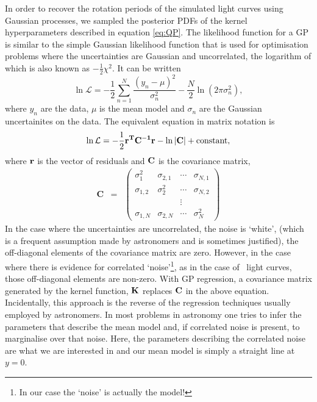 In order to recover the rotation periods of the simulated light curves using
Gaussian processes, we sampled the posterior PDFs of the kernel
hyperparameters described in equation \ref{eq:QP}.
The likelihood function for a GP is similar to the simple Gaussian likelihood
function that is used for optimisation problems where the uncertainties are
Gaussian and uncorrelated, the logarithm of which is also known as
$-\frac{1}{2}\chi^2$.
It can be written
\begin{equation}
\ln \mathcal{L} = -\frac{1}{2}\sum_{n=1}^N\frac{(y_n-\mu)^2}{\sigma_n^2}
    - \frac{N}{2}\ln(2\pi\sigma_n^2),
\end{equation}
\label{eq:chi2}
where $y_n$ are the data, $\mu$ is the mean model and $\sigma_n$ are the
Gaussian uncertainites on the data.
The equivalent equation in matrix notation is
\begin{equation}
\ln \mathcal{L} = -\frac{1}{2}\bf{r}^T\bf{C}^{-1}\bf{r}-\ln|\bf{C}|
    + \mathrm{constant},
\end{equation}
\label{eq:lhf1}
where $\bf{r}$ is the vector of residuals and $\bf{C}$ is the covariance
matrix,
\begin{eqnarray}
	\mathbf{C} &=& \left (\begin{array}{cccc}
	\sigma^2_1 & \sigma_{2, 1} & \cdots & \sigma_{N, 1} \\
	\sigma_{1, 2} & \sigma^2_2 & \cdots & \sigma_{N, 2} \\
    && \vdots & \\
	\sigma_{1, N} & \sigma_{2, N} & \cdots & \sigma^2_N
\end{array}\right )
\end{eqnarray}
In the case where the uncertainties are uncorrelated, the noise is `white',
(which is a frequent assumption made by astronomers and is sometimes
justified), the off-diagonal elements of the covariance matrix are zero.
However, in the case where there is evidence for correlated
`noise'\footnote{In our case the `noise' is actually the model!}, as in the
case of \Kepler\ light curves, those off-diagonal elements are non-zero.
With GP regression, a covariance matrix generated by the kernel function,
${\bf K}$ replaces ${\bf C}$ in the above equation.
Incidentally, this approach is the reverse of the regression techniques
usually employed by astronomers.
In most problems in astronomy one tries to infer the parameters that describe
the mean model and, if correlated noise is present, to marginalise over that
noise.
Here, the parameters describing the correlated noise are what we are
interested in and our mean model is simply a straight line at $y=0$.

